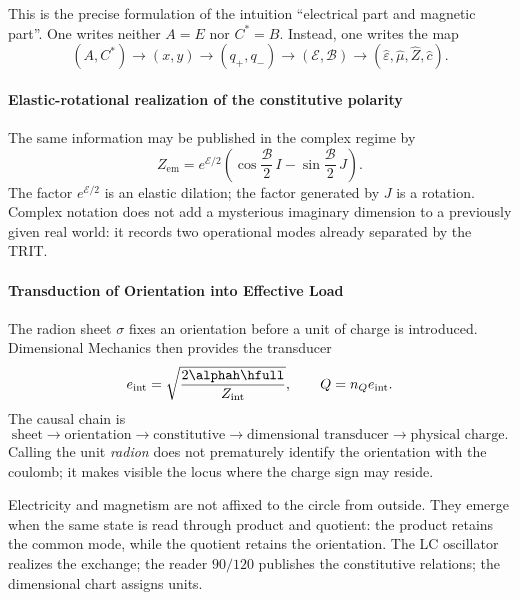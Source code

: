 This is the precise formulation of the intuition \enquote{electrical part and
magnetic part}. One writes neither \(A=E\) nor \(C^*=B\). Instead, one writes the map
\[
(A,C^*)\to(x,y)\to(q_+,q_-)
\to(\mathcal E,\mathcal B)
\to(\widehat\varepsilon,\widehat\mu,\widehat Z,\widehat c).
\]

\paragraph{Elastic-rotational realization of the constitutive polarity}

The same information may be published in the complex regime by
\begin{equation}
Z_{\mathrm{em}}=e^{\mathcal E/2}
\left(\cos\frac{\mathcal B}{2}\,I
-\sin\frac{\mathcal B}{2}\,J\right).
\label{eq:Zem}
\end{equation}
The factor \(e^{\mathcal E/2}\) is an elastic dilation; the factor generated by \(J\) is a rotation. Complex notation does not add a mysterious imaginary dimension to a previously given real world: it records two operational modes already separated by the TRIT.

\paragraph{Transduction of Orientation into Effective Load}

The radion sheet \(\sigma\) fixes an orientation before a
unit of charge is introduced. Dimensional Mechanics then provides the transducer
\[
e_{\mathrm{int}}=\sqrt{\frac{2\alphah\hfull}{Z_{\mathrm{int}}}},
\qquad
Q=n_Qe_{\mathrm{int}}.
\]
The causal chain is
\[
\text{sheet}\to\text{orientation}\to\text{constitutive}
\to\text{dimensional transducer}\to\text{physical charge}.
\]
Calling the unit \emph{radion} does not prematurely identify the orientation
with the coulomb; it makes visible the locus where the charge sign may reside.

\begin{narrativebox}
Electricity and magnetism are not affixed to the circle from outside. They emerge
when the same state is read through product and quotient: the product
retains the common mode, while the quotient retains the orientation. The LC oscillator
realizes the exchange; the reader \(90/120\) publishes the constitutive relations; the
dimensional chart assigns units.
\end{narrativebox}

